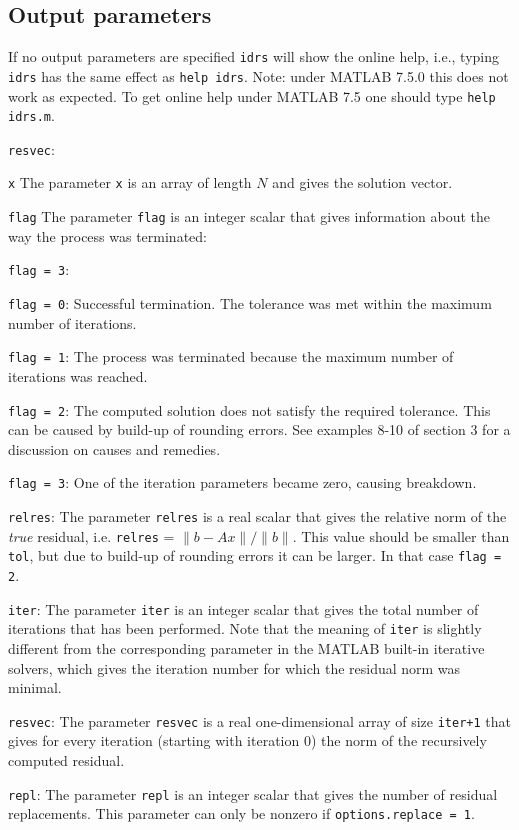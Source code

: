 \documentclass[prodmode,acmtoms]{acmsmall}
\begin{document}
\subsection{Output parameters}
If no output parameters are specified {\tt idrs} will show the online help, i.e., typing {\tt idrs} has the same effect as {\tt help idrs}. 
Note: under MATLAB 7.5.0 this does not work as expected. To get online help under MATLAB 7.5 one should type {\tt help idrs.m}. 
\begin{describe}{{\tt resvec}:}
\item[{\tt x}] The parameter {\tt x} is an array of length $N$ and gives the solution vector.
\item[{\tt flag}] The parameter {\tt flag} is an integer scalar that gives information about the way the process was terminated:
\begin{describe}{{\tt flag = 3}:}
\item[{\tt flag = 0}:] Successful termination. The tolerance was met within the maximum number of iterations.
\item[{\tt flag = 1}:] The process was terminated because the maximum number of iterations was reached.
\item[{\tt flag = 2}:] The computed solution does not satisfy the required tolerance.  This can be caused by build-up 
of rounding errors. See examples 8-10 of section 3 for a discussion on causes and remedies.
\item[{\tt flag = 3}:] One of the iteration parameters became zero, causing breakdown.
\end{describe}
\item[{\tt relres}:] The parameter {\tt relres} is a real scalar that gives the relative norm of the \emph{true} residual, 
i.e. {\tt relres} = $\| b - Ax\|/\|b\|$.
This value should be smaller than {\tt tol}, but due to build-up of rounding errors it can be larger. In that case {\tt flag = 2}.
\item[{\tt iter}:] The parameter {\tt iter} is an integer scalar that gives the total number of iterations that has been performed. Note that the
meaning of {\tt iter} is slightly different from the corresponding parameter
in the MATLAB built-in iterative solvers, which gives the iteration number for which the residual norm was minimal.
\item[{\tt resvec}:] The parameter {\tt resvec} is a real one-dimensional array of size {\tt iter+1} that gives for every iteration (starting with
iteration 0) the norm of the recursively computed residual.
\item[{\tt repl}:] The parameter {\tt repl} is an integer scalar that gives the number of residual replacements. 
This parameter can only be nonzero if {\tt options.replace = 1}. 
\end{describe}
\end{document}
